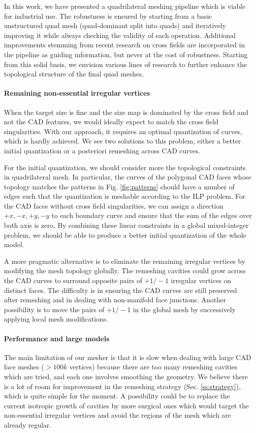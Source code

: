 \documentclass[AMA,STIX1COL]{WileyNJD-v2}
\newcommand\rsec[1]{Sec. \ref{#1}}
\newcommand\rfig[1]{Fig. \ref{#1}}
\begin{document}
{In this work, we have presented a quadrilateral meshing pipeline which is
viable for industrial use. The robustness is ensured by starting from 
a basic unstructured quad mesh (quad-dominant split into quads) and
iteratively improving it while always checking the validity of each operation.
Additional improvements stemming from recent research on cross fields 
are incorporated in the pipeline as guiding information, but never at the cost
of robustness. Starting from this solid basis, we envision various lines 
of research to further enhance the topological structure of the final quad meshes.

\paragraph{Remaining non-essential irregular vertices}
When the target size is fine and the size map is dominated by the cross field
and not the CAD features, we would ideally expect to match the cross field
singularities. With our approach, it requires an optimal quantization of curves,
which is hardly achieved.  We see two solutions to this problem, either a
better initial quantization or a posteriori remeshing across CAD curves.

For the initial quantization, we should consider more the topological constraints
in quadrilateral mesh. In particular, the curves of the polygonal CAD faces whose topology
matches the patterns in \rfig{fig:patterns} should have a number of edges such that
the quantization is meshable according to the ILP problem. For the CAD faces without
cross field singularities, we can assign a direction $+x,-x,+y,-y$ to
each boundary curve and ensure that the sum of the edges over both axis is zero.
By combining these linear constraints in a global mixed-integer problem, we should be
able to produce a better initial quantization of the whole model.

A more pragmatic alternative is to eliminate the remaining irregular vertices
by modifying the mesh topology globally. The remeshing cavities could grow
across the CAD curves to surround opposite pairs of $+1/-1$ irregular vertices on
distinct faces. The difficulty is in ensuring the CAD curves are still preserved
after remeshing and in dealing with non-manifold face junctions. Another possibility
is to move the pairs of $+1/-1$ in the global mesh by successively applying local
mesh modifications.

\paragraph{Performance and large models}
The main limitation of our mesher is that it is slow when dealing with
large CAD face meshes ($>100k$ vertices) because there are too many
remeshing cavities which are tried, and each one involves smoothing
the geometry. We believe there is a lot of room for improvement
in the remeshing strategy (\rsec{ss:strategy}), which is quite
simple for the moment. A possibility could be to replace the current
isotropic growth of cavities by more surgical ones which would target
the non-essential irregular vertices and avoid the regions of the mesh
which are already regular.

}
\end{document}
